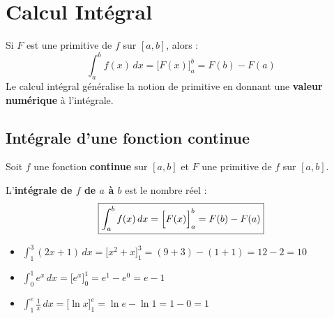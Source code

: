 
\chapter{Calcul Int\'{e}gral}

\begin{rappel}
  Si $F$ est une primitive de $f$ sur $[a,b]$, alors :
  \[
    \int_a^b f(x)\,dx = \bigl[F(x)\bigr]_a^b = F(b) - F(a)
  \]
  Le calcul int\'{e}gral g\'{e}n\'{e}ralise la notion de primitive
  en donnant une \textbf{valeur num\'{e}rique} \`{a} l'int\'{e}grale.
\end{rappel}

\section{Int\'{e}grale d'une fonction continue}

\begin{definition}
  Soit $f$ une fonction \textbf{continue} sur $[a,b]$ et $F$
  une primitive de $f$ sur $[a,b]$.

  \medskip
  L'\textbf{int\'{e}grale de $f$ de $a$ \`{a} $b$} est le nombre r\'{e}el :
  \[
    \boxed{\int_a^b f(x)\,dx = \Bigl[F(x)\Bigr]_a^b = F(b) - F(a)}
  \]
\end{definition}

\begin{exemple}
  \begin{itemize}
    \item $\displaystyle\int_1^3 (2x+1)\,dx
      = \bigl[x^2+x\bigr]_1^3
      = (9+3) - (1+1) = 12 - 2 = 10$

    \medskip
    \item $\displaystyle\int_0^1 e^x\,dx
      = \bigl[e^x\bigr]_0^1
      = e^1 - e^0 = e - 1$

    \medskip
    \item $\displaystyle\int_1^e \frac{1}{x}\,dx
      = \bigl[\ln x\bigr]_1^e
      = \ln e - \ln 1 = 1 - 0 = 1$
  \end{itemize}
\end{exemple}


